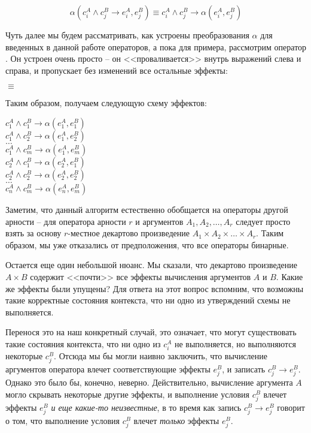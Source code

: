 $$ \alpha(c^A_i \land c^B_j \rightarrow e^A_i, e^B_j) \equiv c^A_i \land c^B_j \rightarrow \alpha(e^A_i, e^B_j) $$

Чуть далее мы будем рассматривать, как устроены преобразования $\alpha$ для введенных в данной работе операторов, а пока для примера, рассмотрим оператор \code{==}. Он устроен очень просто -- он <<проваливается>> внутрь выражений  слева и справа, и пропускает без изменений все остальные эффекты:

 $\equiv$  

Таким образом, получаем следующую схему эффектов:

{
    $c^A_1 \land c^B_1 \rightarrow \alpha(e^A_1, e^B_1)$ \\
    $c^A_1 \land c^B_2 \rightarrow \alpha(e^A_1, e^B_2)$ \\
    $\ldots$ \\
    $c^A_1 \land c^B_m \rightarrow \alpha(e^A_1, e^B_m)$ \\
    $c^A_2 \land c^B_1 \rightarrow \alpha(e^A_2, e^B_1)$ \\
    $c^A_2 \land c^B_2 \rightarrow \alpha(e^A_2, e^B_2)$ \\
    $\ldots$ \\
    $c^A_n \land c^B_m \rightarrow \alpha(e^A_n, e^B_m)$ \\
}{}

Заметим, что данный алгоритм естественно обобщается на операторы другой арности -- для оператора арности $r$ и аргументов $A_1, A_2, \ldots, A_r$ следует просто взять за основу $r$-местное декартово произведение $A_1 \times A_2 \times \ldots \times A_r$. Таким образом, мы уже отказались от предположения, что все операторы бинарные.

\bigskip

Остается еще один небольшой нюанс. Мы сказали, что декартово произведение $A \times B$ содержит <<почти>> все эффекты вычисления аргументов $A$ и $B$. Какие же эффекты были упущены? Для ответа на этот вопрос вспомним, что возможны такие корректные состояния контекста, что ни одно из утверждений схемы не выполняется.

Перенося это на наш конкретный случай, это означает, что могут существовать такие состояния контекста, что ни одно из $c^A_i$ не выполняется, но выполняются некоторые $c^B_j$. Отсюда мы бы могли наивно заключить, что вычисление аргументов оператора влечет соответствующие эффекты $e^B_j$, и записать $c^B_j \rightarrow e^B_j$. Однако это было бы, конечно, неверно. Действительно, вычисление аргумента $A$ могло скрывать некоторые другие эффекты, и выполнение условия $c^B_j$ влечет эффекты $e^B_j$ \emph{и еще какие-то неизвестные}, в то время как запись $c^B_j \rightarrow e^B_j$ говорит о том, что выполнение условия $c^B_j$ влечет \emph{только} эффекты $e^B_j$.


